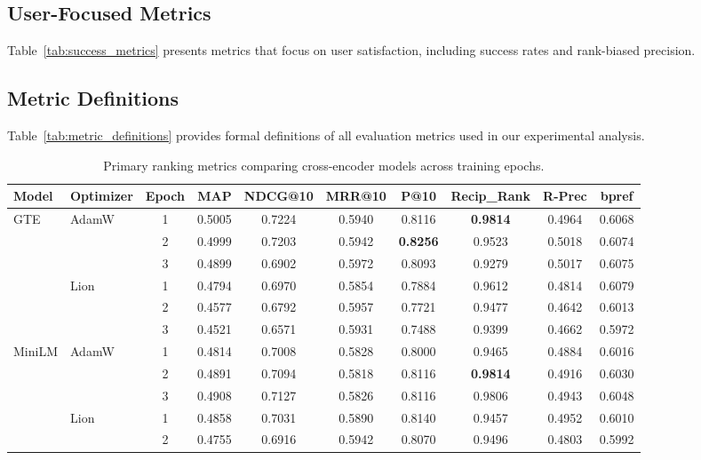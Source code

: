 \documentclass[conference]{IEEEtran}
\begin{document}
\subsection{User-Focused Metrics}
Table~\ref{tab:success_metrics} presents metrics that focus on user satisfaction, including success rates and rank-biased precision.

\subsection{Metric Definitions}
\label{app:metric_defs}
Table~\ref{tab:metric_definitions} provides formal definitions of all evaluation metrics used in our experimental analysis.

\begin{table}[t]
\centering
\caption{Primary ranking metrics comparing cross-encoder models across training epochs.}
\label{tab:primary_metrics}
\small
\begin{tabular}{llcccccccc}
\toprule
\textbf{Model} & \textbf{Optimizer} & \textbf{Epoch} & \textbf{MAP} & \textbf{NDCG@10} & \textbf{MRR@10} & \textbf{P@10} & \textbf{Recip\_Rank} & \textbf{R-Prec} & \textbf{bpref} \\
\midrule
\multirow{6}{*}{GTE} & \multirow{3}{*}{AdamW} 
 & 1 & 0.5005 & 0.7224 & 0.5940 & 0.8116 & \textbf{0.9814} & 0.4964 & 0.6068 \\
 & & 2 & 0.4999 & 0.7203 & 0.5942 & \textbf{0.8256} & 0.9523 & 0.5018 & 0.6074 \\
 & & 3 & 0.4899 & 0.6902 & 0.5972 & 0.8093 & 0.9279 & 0.5017 & 0.6075 \\
\cmidrule{2-10}
 & \multirow{3}{*}{Lion} 
 & 1 & 0.4794 & 0.6970 & 0.5854 & 0.7884 & 0.9612 & 0.4814 & 0.6079 \\
 & & 2 & 0.4577 & 0.6792 & 0.5957 & 0.7721 & 0.9477 & 0.4642 & 0.6013 \\
 & & 3 & 0.4521 & 0.6571 & 0.5931 & 0.7488 & 0.9399 & 0.4662 & 0.5972 \\
\midrule
\multirow{6}{*}{MiniLM} & \multirow{3}{*}{AdamW} 
 & 1 & 0.4814 & 0.7008 & 0.5828 & 0.8000 & 0.9465 & 0.4884 & 0.6016 \\
 & & 2 & 0.4891 & 0.7094 & 0.5818 & 0.8116 & \textbf{0.9814} & 0.4916 & 0.6030 \\
 & & 3 & 0.4908 & 0.7127 & 0.5826 & 0.8116 & 0.9806 & 0.4943 & 0.6048 \\
\cmidrule{2-10}
 & \multirow{3}{*}{Lion} 
 & 1 & 0.4858 & 0.7031 & 0.5890 & 0.8140 & 0.9457 & 0.4952 & 0.6010 \\
 & & 2 & 0.4755 & 0.6916 & 0.5942 & 0.8070 & 0.9496 & 0.4803 & 0.5992 \\

\end{tabular}
\end{table}
\end{document}

